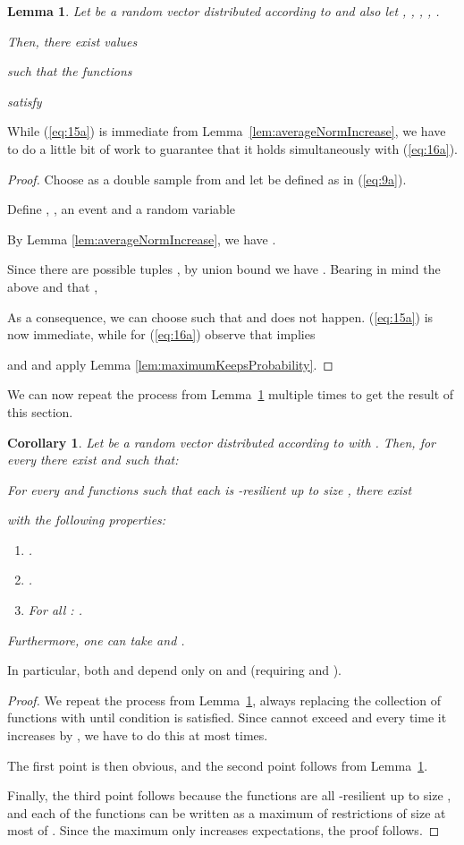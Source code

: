 \documentclass{daj}
\newcommand{\1}{\mathbbm{1}}
\theoremstyle{plain}
\newtheorem{lemma}[theorem]{Lemma}
\newtheorem{corollary}[theorem]{Corollary}
\theoremstyle{definition}
\begin{document}
\begin{lemma}
\label{lem:second-reduction-single-step}
Let  be a random vector distributed according to
 and also let
,
, , ,
.

Then, there exist values 

such that the functions

satisfy

\end{lemma}
While (\ref{eq:15a}) is immediate from
Lemma~\ref{lem:averageNormIncrease}, we have to do a little bit of work 
to guarantee that it holds simultaneously with (\ref{eq:16a}).
\begin{proof}
Choose  as a double sample
from  and let  be defined as in
(\ref{eq:9a}).

Define 
,
,
an event 
and a random variable

By Lemma \ref{lem:averageNormIncrease}, we have .

Since there are  possible tuples
, by union bound we have
.
Bearing in mind the above and that
,


As a consequence, we can choose 
such that  and
 does not happen. (\ref{eq:15a}) is now immediate, while for
(\ref{eq:16a}) observe that  implies

and 
and apply Lemma
\ref{lem:maximumKeepsProbability}.
\end{proof}

We can now repeat the process from Lemma~\ref{lem:second-reduction-single-step}
multiple times to get the result of this section.

\begin{corollary}
\label{cor:low-influence-reduction}
Let  be a random vector distributed according
to  with 
.
Then, for every  there exist  and 
 such that:

For every  and functions
 such that each
 is -resilient up to size , there exist

with the following properties:
\begin{enumerate}
\item
  .
\item .
\item For all :
  .
\end{enumerate}
Furthermore, one can take 
and .
\end{corollary}
In particular, both  and  depend only on  and 
(requiring  and ).
\begin{proof}
We repeat the process from Lemma~\ref{lem:second-reduction-single-step},
always replacing the collection of functions 
with  until condition  is satisfied.
Since  cannot exceed 
and every time it increases by , we have to do this at most
 times.

The first point is then obvious, and the second point follows
from Lemma~\ref{lem:second-reduction-single-step}.

Finally, the third point follows 
because the functions  are all -resilient up to size
, and each of the functions  can be written as 
a maximum of restrictions
of size at most  of . Since the maximum only increases expectations, the proof follows. 
\end{proof}
\end{document}
